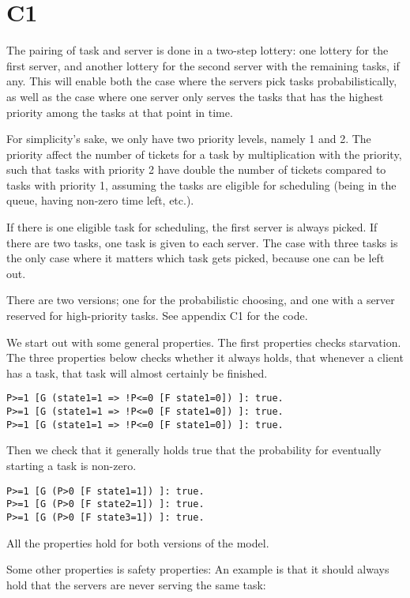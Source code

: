 
\section{C1}

The pairing of task and server is done in a two-step lottery:
one lottery for the first server, and another lottery for
the second server with the remaining tasks, if any.
This will enable both the case where the servers pick
tasks probabilistically, as well as the case where one
server only serves the tasks that has the highest priority
among the tasks at that point in time.

For simplicity's sake, we only have two priority levels, namely 1 and 2.
The priority affect the number of tickets for a task by multiplication
with the priority, such that tasks with priority 2 have double the number
of tickets compared to tasks with priority 1, assuming the tasks are eligible
for scheduling (being in the queue, having non-zero time left, etc.).

If there is one eligible task for scheduling, the first server is always picked.
If there are two tasks, one task is given to each server.
The case with three tasks is the only case where it matters which task gets picked,
because one can be left out.

There are two versions; one for the probabilistic choosing,
and one with a server reserved for high-priority tasks.
See appendix C1 for the code.

We start out with some general properties.
The first properties checks starvation.
The three properties below checks whether it always holds,
that whenever a client has a task,
that task will almost certainly be finished.

\begin{verbatim}
P>=1 [G (state1=1 => !P<=0 [F state1=0]) ]: true.
P>=1 [G (state1=1 => !P<=0 [F state1=0]) ]: true.
P>=1 [G (state1=1 => !P<=0 [F state1=0]) ]: true.
\end{verbatim}

Then we check that it generally holds true that
the probability for eventually starting a task is non-zero.

\begin{verbatim}
P>=1 [G (P>0 [F state1=1]) ]: true.
P>=1 [G (P>0 [F state2=1]) ]: true.
P>=1 [G (P>0 [F state3=1]) ]: true.
\end{verbatim}

All the properties hold for both versions of the model.

Some other properties is safety properties: An example is that
it should always hold that the servers are never serving the same task:


